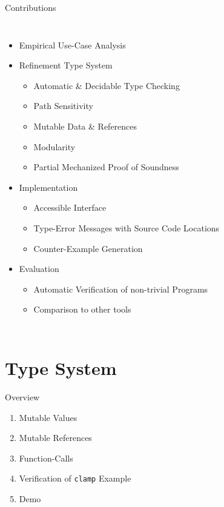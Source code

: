 \documentclass{sdqbeamer}
\newcommand{\code}[1]{\texttt{#1}}
\begin{document}
\begin{frame}{Contributions}
  \begin{columns}
    \begin{itemize}
      \item Empirical Use-Case Analysis
      \item Refinement Type System
      \begin{itemize}
        \item Automatic \& Decidable Type Checking
        \item Path Sensitivity
        \item Mutable Data \& References
        \item Modularity
        \item Partial Mechanized Proof of Soundness
      \end{itemize}
      \item Implementation
      \begin{itemize}
        \item Accessible Interface
        \item Type-Error Messages with Source Code Locations
        \item Counter-Example Generation
      \end{itemize}
      \item Evaluation
      \begin{itemize}
        \item Automatic Verification of non-trivial Programs
        \item Comparison to other tools
      \end{itemize}
    \end{itemize}

  \end{columns}
\end{frame}


\section{Type System}

\begin{frame}{Overview}
  \begin{enumerate}
    \item Mutable Values
    \item Mutable References
    \item Function-Calls 
    \item Verification of \code{clamp} Example
    \item Demo
  \end{enumerate}
  

\end{frame}
\end{document}
